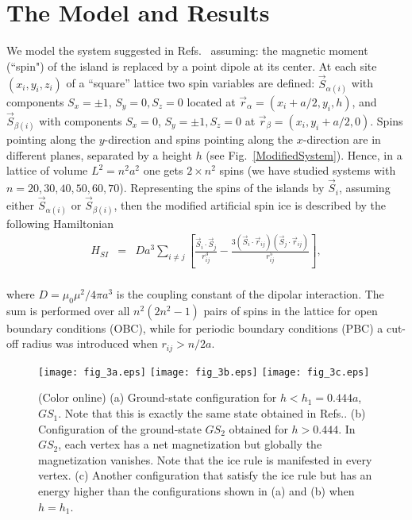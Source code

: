 \documentclass[aps,prb,twocolumn,floatfix,showpacs,amsmath,amssymb]{revtex4}
\begin{document}
\section{The Model and Results}

We model the system suggested in Refs.~ assuming: the magnetic
moment (``spin") of the island is replaced by a point dipole at
its center. At each site $(x_{i},y_{i},z_{i})$ of a ``square'' lattice two
spin variables are defined: $\vec{S}_{\alpha(i)}$ with components
$S_{x}=\pm 1$, $S_{y}=0, S_{z}=0$ located at
$\vec{r}_{\alpha}=(x_{i}+a/2,y_{i},h)$, and $\vec{S}_{\beta(i)}$
with components $S_{x}=0$, $S_{y}=\pm 1, S_{z}=0$ at
$\vec{r}_{\beta}=(x_{i},y_{i}+a/2,0)$. Spins pointing along the
$y$-direction and spins pointing along the $x$-direction are in
different planes, separated by a height $h$ (see Fig.~\ref{ModifiedSystem}).
Hence, in a lattice of volume $L^{2}=n^{2}a^{2}$
one gets $2\times n^{2}$ spins
(we have studied systems with $n=20,30,40,50,60,70$). Representing the spins of the islands by
$\vec{S}_{i}$, assuming either $\vec{S}_{\alpha(i)}$ or
$\vec{S}_{\beta(i)}$, then the modified artificial spin ice is
described by the following Hamiltonian
%
\begin{eqnarray}\label{HamiltonianSI}
H_{SI} &=& Da^{3} \sum_{i\neq j}\left[\frac{\vec{S}_{i}\cdot
\vec{S}_{j}}{r_{ij}^{3}} - \frac{3 (\vec{S}_{i}\cdot
\vec{r}_{ij})(\vec{S}_{j}\cdot \vec{r}_{ij})}{r_{ij}^{5}}\right],
\end{eqnarray}\\
where $D=\mu_{0}\mu^{2}/4\pi a^{3}$ is the coupling constant of
the dipolar interaction. The sum is performed over all
$n^2(2n^{2}-1)$ pairs of spins in the lattice for 
open boundary conditions (OBC), while for periodic boundary conditions (PBC)
a cut-off radius was introduced when $r_{ij}> n/2a$.

\begin{figure}
\texttt{[image: fig\_3a.eps]}
\texttt{[image: fig\_3b.eps]}
\texttt{[image: fig\_3c.eps]}
\caption{\label{groundstates} (Color online) (a) Ground-state
configuration for $h<h_1=0.444a$, $GS_1$. Note that this is
exactly the same state obtained in
Refs.. (b) Configuration of the
ground-state $GS_{2}$ obtained for $h>0.444$. In $GS_{2}$, each
vertex has a net magnetization but globally the magnetization
vanishes. Note that the ice rule is manifested in every vertex.
(c) Another configuration that satisfy the ice rule but has an energy
higher than the configurations shown in (a) and (b) when $h=h_1$.
}
\end{figure}
\end{document}
